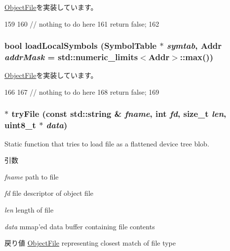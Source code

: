 \hyperlink{classObjectFile_abd8b86c98494f055ba7e0babbd55f4a0}{ObjectFile}を実装しています。


\begin{DoxyCode}
159 {
160     // nothing to do here
161     return false;
162 }
\end{DoxyCode}
\hypertarget{classDtbObject_aab9393b89c15838ac1b842e642f981bb}{
\subsubsection[{loadLocalSymbols}]{\setlength{\rightskip}{0pt plus 5cm}bool loadLocalSymbols ({\bf SymbolTable} $\ast$ {\em symtab}, \/  {\bf Addr} {\em addrMask} = {\ttfamily std::numeric\_\-limits$<${\bf Addr}$>$::max()})}}
\label{classDtbObject_aab9393b89c15838ac1b842e642f981bb}


\hyperlink{classObjectFile_a15e7fbacc339ac9a4d50e4aa36591339}{ObjectFile}を実装しています。


\begin{DoxyCode}
166 {
167     // nothing to do here
168     return false;
169 }
\end{DoxyCode}
\hypertarget{classDtbObject_a3b119de4852833fdf74dbb4b8e1e1eba}{
\subsubsection[{tryFile}]{ $\ast$ tryFile (const std::string \& {\em fname}, \/  int {\em fd}, \/  size\_\-t {\em len}, \/  uint8\_\-t $\ast$ {\em data})}}
\label{classDtbObject_a3b119de4852833fdf74dbb4b8e1e1eba}
Static function that tries to load file as a flattened device tree blob. 
\begin{DoxyParams}{引数}
\item[{\em fname}]path to file \item[{\em fd}]file descriptor of object file \item[{\em len}]length of file \item[{\em data}]mmap'ed data buffer containing file contents \end{DoxyParams}
\begin{DoxyReturn}{戻り値}
\hyperlink{classObjectFile}{ObjectFile} representing closest match of file type 
\end{DoxyReturn}



